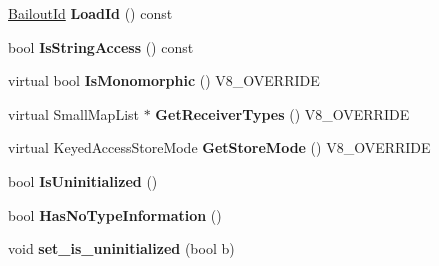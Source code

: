 \begin{DoxyCompactItemize}
\item 
\hypertarget{classv8_1_1internal_1_1_v8___f_i_n_a_l_a032934632104e7d37a985442e4e11d13}{}\hyperlink{classv8_1_1internal_1_1_bailout_id}{Bailout\+Id} {\bfseries Load\+Id} () const \label{classv8_1_1internal_1_1_v8___f_i_n_a_l_a032934632104e7d37a985442e4e11d13}

\item 
\hypertarget{classv8_1_1internal_1_1_v8___f_i_n_a_l_a25419c7ec0b339cf24e75b6d0aa633f5}{}bool {\bfseries Is\+String\+Access} () const \label{classv8_1_1internal_1_1_v8___f_i_n_a_l_a25419c7ec0b339cf24e75b6d0aa633f5}

\item 
\hypertarget{classv8_1_1internal_1_1_v8___f_i_n_a_l_ab3b27577f5e222d5cf5e659ec2135e23}{}virtual bool {\bfseries Is\+Monomorphic} () V8\+\_\+\+O\+V\+E\+R\+R\+I\+D\+E\label{classv8_1_1internal_1_1_v8___f_i_n_a_l_ab3b27577f5e222d5cf5e659ec2135e23}

\item 
\hypertarget{classv8_1_1internal_1_1_v8___f_i_n_a_l_add3b27d1df1c5e153be402bd03ccffdb}{}virtual Small\+Map\+List $\ast$ {\bfseries Get\+Receiver\+Types} () V8\+\_\+\+O\+V\+E\+R\+R\+I\+D\+E\label{classv8_1_1internal_1_1_v8___f_i_n_a_l_add3b27d1df1c5e153be402bd03ccffdb}

\item 
\hypertarget{classv8_1_1internal_1_1_v8___f_i_n_a_l_af32afe1cd92df5e1926837238564755d}{}virtual Keyed\+Access\+Store\+Mode {\bfseries Get\+Store\+Mode} () V8\+\_\+\+O\+V\+E\+R\+R\+I\+D\+E\label{classv8_1_1internal_1_1_v8___f_i_n_a_l_af32afe1cd92df5e1926837238564755d}

\item 
\hypertarget{classv8_1_1internal_1_1_v8___f_i_n_a_l_a37c6f100560570f47e4e173744b7ed1e}{}bool {\bfseries Is\+Uninitialized} ()\label{classv8_1_1internal_1_1_v8___f_i_n_a_l_a37c6f100560570f47e4e173744b7ed1e}

\item 
\hypertarget{classv8_1_1internal_1_1_v8___f_i_n_a_l_a4c6ab6d1b6b96f49f1eddc8941f55b79}{}bool {\bfseries Has\+No\+Type\+Information} ()\label{classv8_1_1internal_1_1_v8___f_i_n_a_l_a4c6ab6d1b6b96f49f1eddc8941f55b79}

\item 
\hypertarget{classv8_1_1internal_1_1_v8___f_i_n_a_l_a13ab518c2faa2e71e0198b786abcc0e6}{}void {\bfseries set\+\_\+is\+\_\+uninitialized} (bool b)\label{classv8_1_1internal_1_1_v8___f_i_n_a_l_a13ab518c2faa2e71e0198b786abcc0e6}


\end{DoxyCompactItemize}
